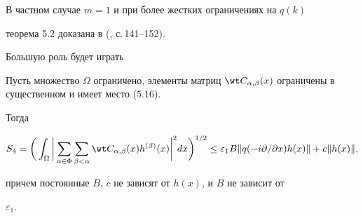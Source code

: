  


\begin{notes} 


В частном случае $m=1$ и при более жестких ограничениях на $q(k)$ 


теорема 5.2 доказана в (\cite{3}, с.\,141--152). 


\end{notes} 


 


Большую роль будет играть 


 


\begin{lems} 


Пусть множество $\Omega$ ограничено, элементы матриц $\wt 


C_{\alpha,\beta}(x)$ ограничены в существенном и имеет место ($5.16$). 


Тогда 


\begin{equation} 


S_4=\bigg(\int_\Omega\bigg|\sum_{\alpha\in\Phi} 


\sum_{\beta<\alpha}\wt C_{\alpha,\beta}(x) 


h^{(\beta)}(x)\bigg|^2dx\bigg)^{1/2}\le 


\varepsilon_1B\|q(-i\partial/\partial x)h(x)\|+c\|h(x)\|, 


\end{equation} 


причем постоянные $B$, $c$ не зависят от $h(x)$, и $B$ не зависит от 


$\varepsilon_1$. 


\end{lems} 


 


